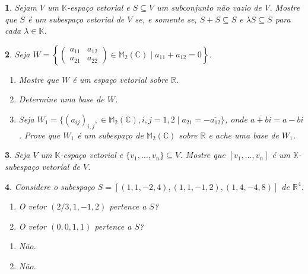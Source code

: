 \documentclass[12pt]{exam}
\newtheorem{exercicio}{}
\newcommand{\sub}{\subseteq}
\newcommand{\real}{\mathbb{R}}
\newcommand{\complex}{\mathbb{C}}
\newcommand{\cp}[1]{\mathbb{#1}}
\begin{document}
\begin{exercicio}
  Sejam $V$ um $\cp{K}$-espa\c{c}o vetorial e $S \sub V $ um subconjunto n\~ao vazio de $V$. Mostre que $S$ \'e um subespa\c{c}o vetorial de $V$ se, e somente se, $S + S \sub S$ e $\lambda S \sub S$ para cada $\lambda \in \cp{K}$.
\end{exercicio}

\begin{exercicio}
  Seja $W = \left\{\begin{pmatrix} a_{11} & a_{12}\\ a_{21} & a_{22}\end{pmatrix} \in \cp{M}_2(\complex) \mid a_{11} + a_{12} = 0\right\}$.
  \begin{enumerate}[label={\alph*})]
    \item Mostre que $W$ \'e um espa\c{c}o vetorial sobre $\real$.
    \item Determine uma base de $W$.
    \item Seja $W_1 = \{(a_{ij})_{i,j}, \in \cp{M}_2(\complex), i, j = 1, 2 \mid a_{21} = -\overline{a_{12}}\}$, onde $\overline{a + bi} = a - bi$. Prove que $W_1$ \'e um subespa\c{c}o de $\cp{M}_2(\complex)$ sobre $\real$ e ache uma base de $W_1$.
  \end{enumerate}
\end{exercicio}

\begin{exercicio}
  Seja $V$ um $\cp{K}$-espa\c{c}o vetorial e $\{v_1,\dots,v_n\} \sub V$. Mostre que $[v_1,\dots,v_n]$ \'e um $\cp{K}$-subespa\c{c}o vetorial de $V$.
\end{exercicio}

\begin{exercicio}
  Considere o subespa\c{c}o $S = [(1,1,-2,4),(1,1,-1,2),(1,4,-4,8)]$ de $\real^4$.
  \begin{enumerate}[label={\alph*})]
    \item O vetor $(2/3, 1, -1, 2)$ pertence a $S$?
    \item O vetor $(0, 0, 1, 1)$ pertence a $S$?
  \end{enumerate}
  \begin{solucao}
    \begin{enumerate}[label={\alph*})]
      \item N\~ao.
      \item N\~ao.
    \end{enumerate}
  \end{solucao}
\end{exercicio}
\end{document}
